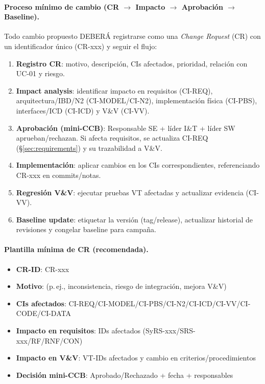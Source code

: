 \paragraph{Proceso mínimo de cambio (CR $\rightarrow$ Impacto $\rightarrow$ Aprobación $\rightarrow$ Baseline).}
Todo cambio propuesto DEBERÁ registrarse como una \textit{Change Request} (CR) con un identificador único (CR-xxx) y seguir el flujo:
\begin{enumerate}
  \item \textbf{Registro CR}: motivo, descripción, CIs afectados, prioridad, relación con UC-01 y riesgo.
  \item \textbf{Impact analysis}: identificar impacto en requisitos (CI-REQ), arquitectura/IBD/N2 (CI-MODEL/CI-N2), implementación física (CI-PBS), interfaces/ICD (CI-ICD) y V\&V (CI-VV).
  \item \textbf{Aprobación (mini-CCB)}: Responsable SE + líder I\&T + líder SW aprueban/rechazan. Si afecta requisitos, se actualiza CI-REQ (\S\ref{sec:requirements}) y su trazabilidad a V\&V.
  \item \textbf{Implementación}: aplicar cambios en los CIs correspondientes, referenciando CR-xxx en commits/notas.
  \item \textbf{Regresión V\&V}: ejecutar pruebas VT afectadas y actualizar evidencia (CI-VV).
  \item \textbf{Baseline update}: etiquetar la versión (tag/release), actualizar historial de revisiones y congelar baseline para campaña.
\end{enumerate}

\paragraph{Plantilla mínima de CR (recomendada).}
\begin{itemize}
  \item \textbf{CR-ID}: CR-xxx
  \item \textbf{Motivo}: (p.\,ej., inconsistencia, riesgo de integración, mejora V\&V)
  \item \textbf{CIs afectados}: CI-REQ/CI-MODEL/CI-PBS/CI-N2/CI-ICD/CI-VV/CI-CODE/CI-DATA
  \item \textbf{Impacto en requisitos}: IDs afectados (SyRS-xxx/SRS-xxx/RF/RNF/CON)
  \item \textbf{Impacto en V\&V}: VT-IDs afectados y cambio en criterios/procedimientos
  \item \textbf{Decisión mini-CCB}: Aprobado/Rechazado + fecha + responsables
\end{itemize}

